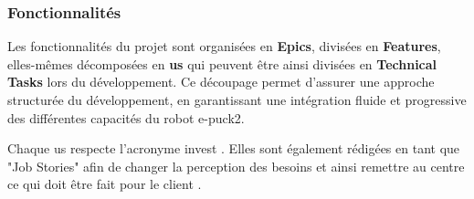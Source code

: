 \subsubsection{Fonctionnalités} \label{sec:features}

Les fonctionnalités du projet sont organisées en \textbf{Epics}, divisées en \textbf{Features}, elles-mêmes décomposées en \textbf{\acrfull{us}} qui peuvent être ainsi divisées en \textbf{Technical Tasks} lors du développement.
Ce découpage permet d’assurer une approche structurée du développement, en garantissant une intégration fluide et progressive des différentes capacités du robot e-puck2.

Chaque \acrshort{us} respecte l'acronyme \acrfull{invest} \autocite{alliance_what_2015}.
Elles sont également rédigées en tant que "Job Stories" afin de changer la perception des besoins et ainsi remettre au centre ce qui doit être fait pour le client \autocite{klement_replacing_2018}.

